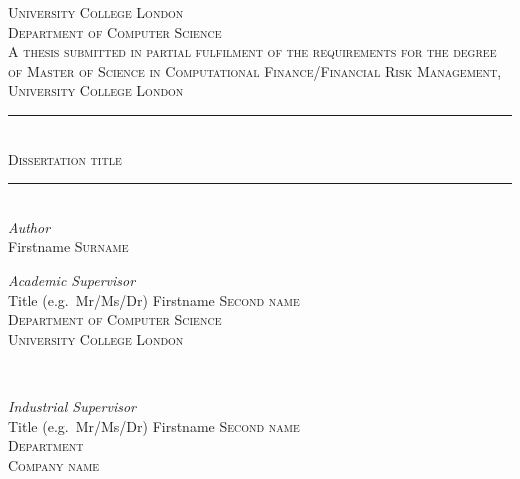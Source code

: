 \documentclass[11pt,a4paper,oneside]{book}
\begin{document}
\pagestyle{plain}
\frontmatter
\begin{titlepage} %
	\newcommand{\HRule}{\rule{\linewidth}{0.5mm}} %
	
	\center %
	\textsc{\LARGE University College London}\\[1.5cm] %
	
	\textsc{\Large Department of Computer Science}\\[0.5cm] %
	
	\textsc{\large A thesis submitted in partial fulfilment of the requirements for the degree of Master of Science in Computational Finance/Financial Risk Management, University College London}\\[0.5cm] %
	\HRule\\[0.4cm]
	\textsc{\huge Dissertation title}\\[0.4cm] %
	\HRule\\[1.5cm]
	{\large\textit{Author}}\\
	Firstname \textsc{Surname} %
	\vfill
	\begin{minipage}{0.48\textwidth}
		\begin{flushleft}
			\large
			\textit{Academic Supervisor}\\
			Title (e.g.~Mr/Ms/Dr) Firstname \textsc{Second name}\\ %
			\textsc{Department of Computer Science}\\
			\textsc{University College London}
		\end{flushleft}
	\end{minipage}
	~%
	\begin{minipage}{0.48\textwidth}
		\begin{flushright}
			\large
			\textit{Industrial Supervisor}\\
			Title (e.g.~Mr/Ms/Dr) Firstname  \textsc{Second name}\\ %
			\textsc{Department}\\%
			\textsc{Company name}%
		\end{flushright}
	\end{minipage}
	\vfill\vfill\vfill %
	

\end{titlepage}
\end{document}
